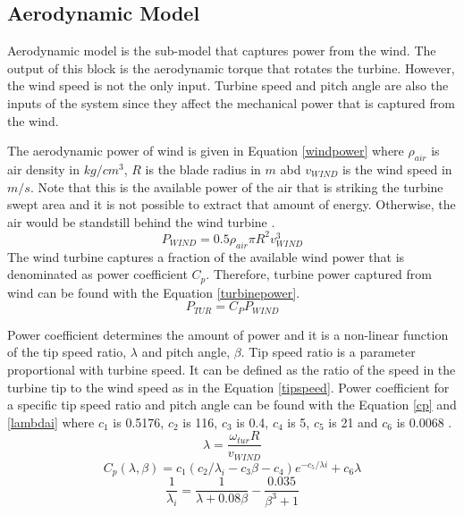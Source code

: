 \subsection{Aerodynamic Model}
Aerodynamic model is the sub-model that captures power from the wind. The output of this block is the aerodynamic torque that rotates the turbine. However, the wind speed is not the only input. Turbine speed and pitch angle are also the inputs of the system since they affect the mechanical power that is captured from the wind.\par
The aerodynamic power of wind is given in Equation \ref{windpower} where $\rho_{air}$ is air density in $kg/cm^{3}$, $R$ is the blade radius in $m$ abd $v_{WIND}$ is the wind speed in $m/s$. Note that this is the available power of the air that is striking the turbine swept area and it is not possible to extract that amount of energy. Otherwise, the air would be standstill behind the wind turbine \cite{Ackermann2005a}.
\begin{equation}
P_{WIND}=0.5\rho_{air}\pi R^{2} v_{WIND}^{3}
\label{windpower}
\end{equation}
The wind turbine captures a fraction of the available wind power that is denominated as power coefficient $C_{p}$. Therefore, turbine power captured from wind can be found with the Equation \ref{turbinepower}.
\begin{equation}
P_{TUR}=C_{P}P_{WIND}
\label{turbinepower}
\end{equation}

Power coefficient determines the amount of power and it is a non-linear function of the tip speed ratio, $\lambda$ and pitch angle, $\beta$. Tip speed ratio is a parameter proportional with turbine speed. It can be defined as the ratio of the speed in the turbine tip to the wind speed as in the Equation \ref{tipspeed}. Power coefficient for a specific tip speed ratio and pitch angle can be found with the Equation \ref{cp} and \ref{lambdai} where $c_{1}$ is 0.5176, $c_{2}$ is 116, $c_{3}$ is 0.4, $c_{4}$ is 5, $c_{5}$ is 21 and $c_{6}$ is 0.0068 \cite{Heier}. \\
\begin{equation}
\lambda=\frac{\omega_{tur}R}{v_{WIND}}
\label{tipspeed}
\end{equation}
\begin{equation}
C_{p}(\lambda,\beta)=c_{1}(c_{2}/\lambda_{i}-c_{3}\beta-c_{4})e^{-c_{5}/\lambda{i}}+c_{6}\lambda
\label{cp}
\end{equation}
\begin{equation}
\frac{1}{\lambda_{i}}=\frac{1}{\lambda+0.08\beta}-\frac{0.035}{\beta^{3}+1} 
\label{lambdai}
\end{equation}

